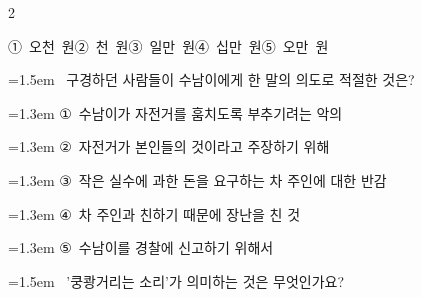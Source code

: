 \documentclass[11pt, a4paper]{article}
\begin{document}
\begin{multicols}{2}
\begin{minipage}{\columnwidth}
\vspace{0.5mm}
\noindent
\mbox{①~오천 원}\hspace{1em}\mbox{②~천 원}\hspace{1em}\mbox{③~일만 원}\hspace{1em}\mbox{④~십만 원}\hspace{1em}\mbox{⑤~오만 원}

\vspace{4mm}
\end{minipage}
\par

\noindent\begin{minipage}{\columnwidth}
\vspace{2mm}
{\hangindent=1.5em  ~구경하던 사람들이 수남이에게 한 말의 의도로 적절한 것은?\par}

\vspace{0.5mm}
{\hangindent=1.3em  \noindent\hspace{0.3em}①~수남이가 자전거를 훔치도록 부추기려는 악의\par}
{\hangindent=1.3em  \noindent\hspace{0.3em}②~자전거가 본인들의 것이라고 주장하기 위해\par}
{\hangindent=1.3em  \noindent\hspace{0.3em}③~작은 실수에 과한 돈을 요구하는 차 주인에 대한 반감\par}
{\hangindent=1.3em  \noindent\hspace{0.3em}④~차 주인과 친하기 때문에 장난을 친 것\par}
{\hangindent=1.3em  \noindent\hspace{0.3em}⑤~수남이를 경찰에 신고하기 위해서\par}
\vspace{4mm}
\end{minipage}
\par

\noindent\begin{minipage}{\columnwidth}
\vspace{2mm}
{\hangindent=1.5em  ~'쿵쾅거리는 소리'가 의미하는 것은 무엇인가요?\par}


\end{minipage}
\end{multicols}
\end{document}
